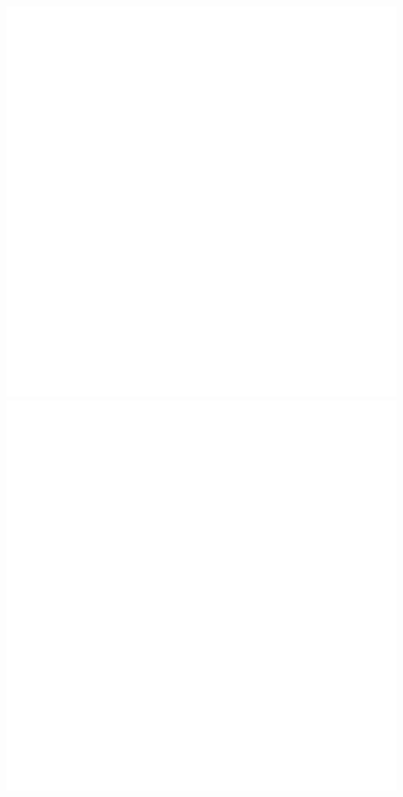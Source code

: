 \documentclass[letterpaper,10pt]{article}
\begin{document}
\begin{description}
\begin{enumerate}
\begin{center}
\includegraphics[scale=.33]{FuelvRepairOut.png}
\includegraphics[scale=.33]{FuelvCapitalOut.png}

\end{center}
\end{enumerate}
\end{description}
\end{document}
